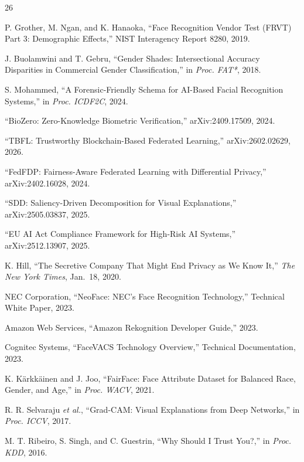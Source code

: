 \documentclass[conference]{IEEEtran}
\begin{document}
\begin{thebibliography}{26}

P. Grother, M. Ngan, and K. Hanaoka, ``Face Recognition Vendor Test (FRVT) Part 3: Demographic Effects,'' NIST Interagency Report 8280, 2019.

J. Buolamwini and T. Gebru, ``Gender Shades: Intersectional Accuracy Disparities in Commercial Gender Classification,'' in \emph{Proc. FAT*}, 2018.

S. Mohammed, ``A Forensic-Friendly Schema for AI-Based Facial Recognition Systems,'' in \emph{Proc. ICDF2C}, 2024.

``BioZero: Zero-Knowledge Biometric Verification,'' arXiv:2409.17509, 2024.

``TBFL: Trustworthy Blockchain-Based Federated Learning,'' arXiv:2602.02629, 2026.

``FedFDP: Fairness-Aware Federated Learning with Differential Privacy,'' arXiv:2402.16028, 2024.

``SDD: Saliency-Driven Decomposition for Visual Explanations,'' arXiv:2505.03837, 2025.

``EU AI Act Compliance Framework for High-Risk AI Systems,'' arXiv:2512.13907, 2025.

K. Hill, ``The Secretive Company That Might End Privacy as We Know It,'' \emph{The New York Times}, Jan.\ 18, 2020.

NEC Corporation, ``NeoFace: NEC's Face Recognition Technology,'' Technical White Paper, 2023.

Amazon Web Services, ``Amazon Rekognition Developer Guide,'' 2023.

Cognitec Systems, ``FaceVACS Technology Overview,'' Technical Documentation, 2023.

K. K{\"a}rkk{\"a}inen and J. Joo, ``FairFace: Face Attribute Dataset for Balanced Race, Gender, and Age,'' in \emph{Proc. WACV}, 2021.

R. R. Selvaraju \emph{et al.}, ``Grad-CAM: Visual Explanations from Deep Networks,'' in \emph{Proc. ICCV}, 2017.

M. T. Ribeiro, S. Singh, and C. Guestrin, ``Why Should I Trust You?,'' in \emph{Proc. KDD}, 2016.


\end{thebibliography}
\end{document}
